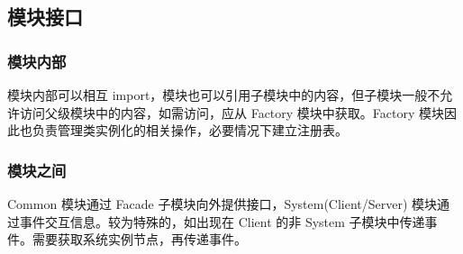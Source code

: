 \subsection{模块接口}
\subsubsection{模块内部}

模块内部可以相互 import，模块也可以引用子模块中的内容，但子模块一般不允许访问父级模块中的内容，如需访问，应从 Factory 模块中获取。Factory 模块因此也负责管理类实例化的相关操作，必要情况下建立注册表。

\subsubsection{模块之间}
Common 模块通过 Facade 子模块向外提供接口，System(Client/Server) 模块通过事件交互信息。较为特殊的，如出现在 Client 的非 System 子模块中传递事件。需要获取系统实例节点，再传递事件。

\newpage